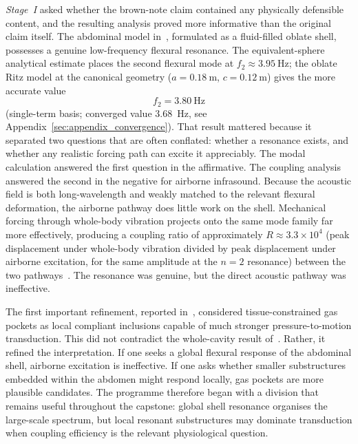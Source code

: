 \emph{Stage~I} asked whether the brown-note claim contained any
physically defensible content, and the resulting analysis proved more informative
than the original claim itself.  The abdominal model in~\cite{BrowntoneP1},
formulated as a fluid-filled oblate shell, possesses a genuine low-frequency
flexural resonance.  The equivalent-sphere analytical estimate places the
second flexural mode at $f_{2}\approx\SI{3.95}{\hertz}$; the oblate Ritz model
at the canonical geometry ($a=\SI{0.18}{\metre}$, $c=\SI{0.12}{\metre}$) gives
the more accurate value
\begin{equation}
f_{2} = \SI{3.80}{\hertz}
\label{eq:background-f2}
\end{equation}
(single-term basis; converged value \SI{3.68}{\hertz}, see
Appendix~\ref{sec:appendix_convergence}).
That result mattered because it separated two questions that are often
conflated: whether a resonance exists, and whether any realistic forcing path
can excite it appreciably.  The modal calculation answered the first question
in the affirmative.  The coupling analysis answered the second in the negative
for airborne infrasound.  Because the acoustic field is both long-wavelength
and weakly matched to the relevant flexural deformation, the airborne pathway
does little work on the shell.  Mechanical forcing through whole-body vibration
projects onto the same mode family far more effectively, producing a coupling
ratio of approximately $R \approx 3.3 \times 10^{4}$ (peak displacement
under whole-body vibration divided by peak displacement under airborne
excitation, for the same amplitude at the $n=2$ resonance)
between the two pathways~\cite{BrowntoneP1}.  The resonance was genuine, but the
direct acoustic pathway was ineffective.

The first important refinement, reported in~\cite{BrowntoneP2}, considered
tissue-constrained gas pockets as local compliant inclusions capable of much
stronger pressure-to-motion transduction.  This did not contradict the
whole-cavity result of~\cite{BrowntoneP1}.  Rather, it refined the
interpretation.  If one seeks a global
flexural response of the abdominal shell, airborne excitation is ineffective.
If one asks whether smaller substructures embedded within the abdomen might
respond locally, gas pockets are more plausible candidates.  The programme
therefore began with a division that remains useful throughout the capstone:
global shell resonance organises the large-scale spectrum, but local resonant
substructures may dominate transduction when coupling efficiency is the
relevant physiological question.

